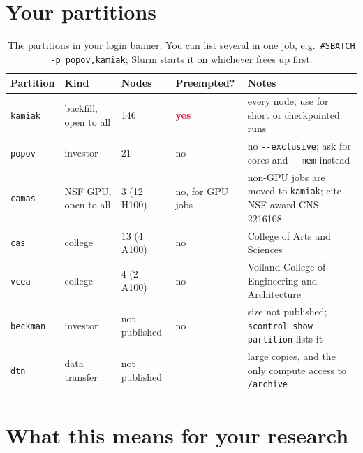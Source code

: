 \documentclass[10pt,letterpaper]{article}
\begin{document}
\section{Your partitions}

\begin{table}[H]
\small
\begin{tabularx}{\textwidth}{@{}l l l l X@{}}
\toprule
\textbf{Partition} & \textbf{Kind} & \textbf{Nodes} & \textbf{Preempted?} & \textbf{Notes}\\
\midrule
\texttt{kamiak} & backfill, open to all & 146 & \textcolor{crimson}{\textbf{yes}} & every node; use for short or checkpointed runs\\
\texttt{popov} & investor & 21 & no & no \texttt{-{}-exclusive}; ask for cores and \texttt{-{}-mem} instead\\
\texttt{camas} & NSF GPU, open to all & 3 (12 H100) & no, for GPU jobs & non-GPU jobs are moved to \texttt{kamiak}; cite NSF award CNS-2216108\\
\texttt{cas} & college & 13 (4 A100) & no & College of Arts and Sciences\\
\texttt{vcea} & college & 4 (2 A100) & no & Voiland College of Engineering and Architecture\\
\texttt{beckman} & investor & not published & no & size not published; \texttt{scontrol show partition} lists it\\
\texttt{dtn} & data transfer & not published & & large copies, and the only compute access to \texttt{/archive}\\
\bottomrule
\end{tabularx}
\caption{The partitions in your login banner. You can list several in one job, e.g.\ \texttt{\#SBATCH -p popov,kamiak}; Slurm starts it on whichever frees up first.}
\end{table}

\section{What this means for your research}
\end{document}
